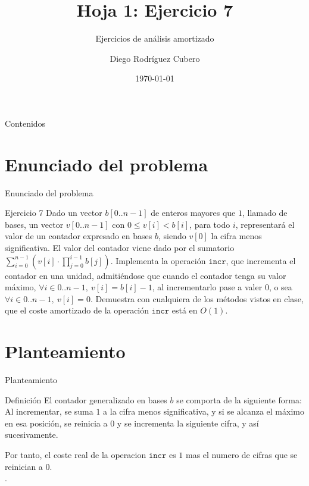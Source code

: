 \documentclass[aspectratio=169]{beamer}
\title{Hoja 1: Ejercicio 7}
\subtitle{Ejercicios de análisis amortizado}
\author{Diego Rodríguez Cubero}
\institute{UCM}
\date{\today}
\begin{document}
\begin{frame}
    \titlepage
\end{frame}

\begin{frame}{Contenidos}
    \tableofcontents
\end{frame}

\section{Enunciado del problema}
\begin{frame}{Enunciado del problema}
    \begin{block}{Ejercicio 7}
        Dado un vector $b[0..n-1]$ de enteros mayores que $1$, llamado de bases, un vector $v[0..n-1]$ con $0 \leq v[i] < b[i]$, para todo $i$, representará el valor de un contador expresado en bases $b$, siendo $v[0]$ la cifra menos significativa. El valor del contador viene dado por el sumatorio $\sum_{i=0}^{n-1} \left(v[i] \cdot \prod_{j=0}^{i-1} b[j]\right)$. Implementa la operación $\texttt{incr}$, que incrementa el contador en una unidad, admitiéndose que cuando el contador tenga su valor máximo, $\forall i \in 0..n-1,\ v[i] = b[i] - 1$, al incrementarlo pase a valer $0$, o sea $\forall i \in 0..n-1,\ v[i] = 0$. Demuestra con cualquiera de los métodos vistos en clase, que el coste amortizado de la operación $\texttt{incr}$ está en $O(1)$.
    \end{block}
\end{frame}

\section{Planteamiento}
\begin{frame}{Planteamiento}
    \begin{exampleblock}{Definición}
        El contador generalizado en bases $b$ se comporta de la siguiente forma:\\
        Al incrementar, se suma $1$ a la cifra menos significativa, y si se alcanza el máximo en esa posición, se reinicia a $0$ y se incrementa la siguiente cifra, y así sucesivamente.
    \end{exampleblock}
    Por tanto, el coste real de la operacion $\texttt{incr}$ es $1$ mas el numero de cifras que se reinician a $0$.\\.
\end{frame}
\end{document}
